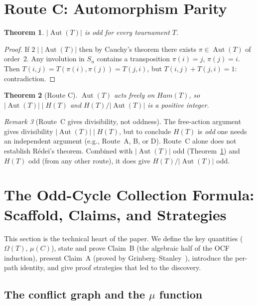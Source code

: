 \documentclass[12pt,reqno]{amsart}
\theoremstyle{plain}
\newtheorem{theorem}{Theorem}[section]
\theoremstyle{definition}
\theoremstyle{remark}
\newtheorem{remark}[theorem]{Remark}
\DeclareMathOperator{\Aut}{Aut}
\newcommand{\Ham}{\mathrm{Ham}}
\newcommand{\routeC}{\textcolor{inkblue}{\textbf{Route~C}}}
\renewcommand{\Ham}{Ham}%
\renewcommand{\routeC}{Route C}%
\begin{document}
\section{Route C: Automorphism Parity}
\label{sec:routeC}

\begin{theorem}\label{thm:aut_odd}
$|\Aut(T)|$ is odd for every tournament $T$.
\end{theorem}
\begin{proof}
If $2\mid|\Aut(T)|$ then by Cauchy's theorem there exists $\pi\in\Aut(T)$ of
order~$2$. Any involution in $S_n$ contains a transposition $\pi(i)=j$,
$\pi(j)=i$. Then $T(i,j)=T(\pi(i),\pi(j))=T(j,i)$, but $T(i,j)+T(j,i)=1$:
contradiction.
\end{proof}

\begin{theorem}[\routeC]\label{thm:class_size}
$\Aut(T)$ acts freely on $\Ham(T)$, so $|\Aut(T)|\mid H(T)$ and
$H(T)/|\Aut(T)|$ is a positive integer.
\end{theorem}
\begin{remark}[Route~C gives divisibility, not oddness]
The free-action argument gives divisibility $|\Aut(T)|\mid H(T)$, but
to conclude $H(T)$ is \emph{odd} one needs an independent argument (e.g.,
Route~A, B, or D). Route~C alone does not establish Rédei's theorem.
Combined with $|\Aut(T)|$ odd (Theorem~\ref{thm:aut_odd}) and $H(T)$ odd
(from any other route), it does give $H(T)/|\Aut(T)|$ odd.
\end{remark}

\section{The Odd-Cycle Collection Formula: Scaffold, Claims, and Strategies}
\label{sec:ocf}

\noindent This section is the technical heart of the paper. We define the key
quantities ($\Omega(T)$, $\mu(C)$), state and prove Claim~B (the algebraic half
of the OCF induction), present Claim~A (proved by Grinberg--Stanley~\cite{grinberg2024}),
introduce the per-path identity, and give proof strategies that led to the discovery.

\subsection{The conflict graph and the $\mu$ function}
\end{document}

